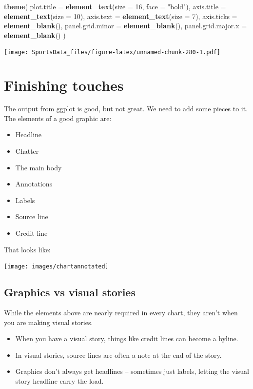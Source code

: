 \documentclass[
]{book}
\newenvironment{Shaded}{\begin{snugshade}}{\end{snugshade}}
\newcommand{\DataTypeTok}[1]{\textcolor[rgb]{0.13,0.29,0.53}{#1}}
\newcommand{\DecValTok}[1]{\textcolor[rgb]{0.00,0.00,0.81}{#1}}
\newcommand{\KeywordTok}[1]{\textcolor[rgb]{0.13,0.29,0.53}{\textbf{#1}}}
\newcommand{\NormalTok}[1]{#1}
\newcommand{\StringTok}[1]{\textcolor[rgb]{0.31,0.60,0.02}{#1}}
\providecommand{\tightlist}{%
  \setlength{\itemsep}{0pt}\setlength{\parskip}{0pt}}
\begin{document}
\begin{Shaded}
\begin{Highlighting}[]
\StringTok{  }\KeywordTok{theme}\NormalTok{(}
    \DataTypeTok{plot.title =} \KeywordTok{element_text}\NormalTok{(}\DataTypeTok{size =} \DecValTok{16}\NormalTok{, }\DataTypeTok{face =} \StringTok{"bold"}\NormalTok{),}
    \DataTypeTok{axis.title =} \KeywordTok{element_text}\NormalTok{(}\DataTypeTok{size =} \DecValTok{10}\NormalTok{),}
    \DataTypeTok{axis.text =} \KeywordTok{element_text}\NormalTok{(}\DataTypeTok{size =} \DecValTok{7}\NormalTok{),}
    \DataTypeTok{axis.ticks =} \KeywordTok{element_blank}\NormalTok{(),}
    \DataTypeTok{panel.grid.minor =} \KeywordTok{element_blank}\NormalTok{(),}
    \DataTypeTok{panel.grid.major.x =} \KeywordTok{element_blank}\NormalTok{()}
\NormalTok{  )}
\end{Highlighting}
\end{Shaded}

\texttt{[image: SportsData\_files/figure-latex/unnamed-chunk-280-1.pdf]}

\hypertarget{finishing-touches}{%
\chapter{Finishing touches}\label{finishing-touches}}

The output from ggplot is good, but not great. We need to add some pieces to it. The elements of a good graphic are:

\begin{itemize}
\tightlist
\item
  Headline
\item
  Chatter
\item
  The main body
\item
  Annotations
\item
  Labels
\item
  Source line
\item
  Credit line
\end{itemize}

That looks like:

\texttt{[image: images/chartannotated]}

\hypertarget{graphics-vs-visual-stories}{%
\section{Graphics vs visual stories}\label{graphics-vs-visual-stories}}

While the elements above are nearly required in every chart, they aren't when you are making visual stories.

\begin{itemize}
\tightlist
\item
  When you have a visual story, things like credit lines can become a byline.
\item
  In visual stories, source lines are often a note at the end of the story.
\item
  Graphics don't always get headlines -- sometimes just labels, letting the visual story headline carry the load.
\end{itemize}
\end{document}
